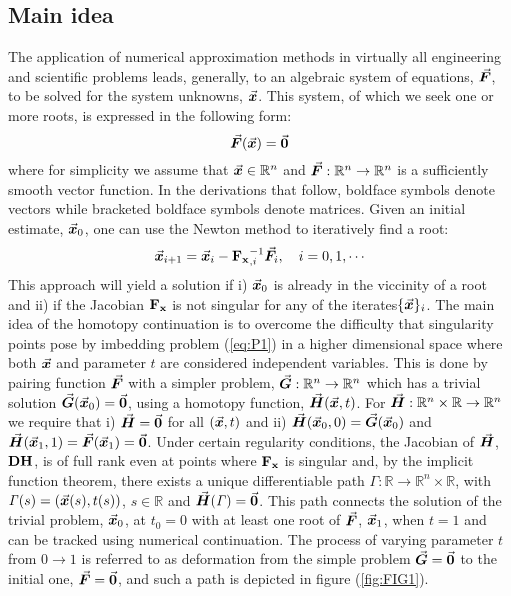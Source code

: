 \subsection{Main idea}\label{CH4-S1SS1}

The application of numerical approximation methods in virtually all engineering
and scientific problems leads, generally, to an algebraic system of equations,
$\vec{\bm{F}}$, to
be solved for the system unknowns, $\vec{\bm{x}}$. This system, of which we seek one
or more roots, is expressed in the following form:
\begin{equation}
\vec{\bm{F}}(\vec{\bm{x}})=\vec{\bm{0}}
\label{eq:P1}
\end{equation}
where for simplicity we assume that $\vec{\bm{x}}\in\mathbb{R}^n$ and
$\vec{\bm{F}}:\mathbb{R}^n\rightarrow\mathbb{R}^n$ is a
sufficiently smooth vector function. In the derivations that follow, boldface
symbols denote vectors while bracketed boldface symbols denote matrices. Given 
an initial estimate, $\vec{\bm{x}}_0$,
one can use the Newton method to iteratively find a root:
\begin{equation}
\bvec{x}_{i+1} = \bvec{x}_i-\bmat{F_x}^{-1}_{,i}\bvec{F}_i,\quad i=0,1,\cdots
\label{eq:NEWTON}
\end{equation}
This approach will yield a solution if i) $\vec{\bm{x}}_0$ is already in the 
viccinity
of a root and ii) if the Jacobian $\mathbf{F_x}$ is not singular for any of 
the iterates$\{\vec{\bm{x}}\}_i$. The main idea of the homotopy continuation is to 
overcome the difficulty that
singularity points pose by imbedding problem (\ref{eq:P1}) in a higher
dimensional space where both $\vec{\bm{x}}$ and parameter $t$ are considered 
independent variables.
This is done by pairing function $\vec{\bm{F}}$ with a simpler problem,
$\vec{\bm{G}}:\mathbb{R}^n\rightarrow\mathbb{R}^n$ which has a trivial solution 
$\vec{\bm{G}}(\vec{\bm{x}}_0)=\vec{\bm{0}}$, using a homotopy function, 
$\vec{\bm{H}}(\vec{\bm{x}},t)$. 
For $\vec{\bm{H}}:\mathbb{R}^n\times\mathbb{R}\rightarrow \mathbb{R}^n$ we require
that
i) $\vec{\bm{H}}=\vec{\bm{0}}$ for all $(\vec{\bm{x}},t)$ and ii)
$\vec{\bm{H}}(\vec{\bm{x}}_0,0)=\vec{\bm{G}}(\vec{\bm{x}}_0)$ and
$\vec{\bm{H}}(\vec{\bm{x}}_1,1)=\vec{\bm{F}}(\vec{\bm{x}}_1)=\vec{\bm{0}}$. Under certain 
regularity 
conditions, the Jacobian of
$\vec{\bm{H}}$, $\mathbf{DH}$, is of full rank even at points where $\mathbf{F_x}$ 
is
singular and, by the implicit function theorem, there exists a unique 
differentiable path
$\mathit{\Gamma}:\mathbb{R}\rightarrow\mathbb{R}^{n}\times\mathbb{R}$, 
with $\mathit{\Gamma}(s)=(\vec{\bm{x}}(s),t(s))$, $s\in\mathbb{R}$ and
$\vec{\bm{H}}(\mathit{\Gamma})=\vec{\bm{0}}$.
This path connects the solution of the trivial problem, $\vec{\bm{x}}_0$, at $t_0=0$
with at least one root of $\vec{\bm{F}}$, $\vec{\bm{x}}_1$, when $t=1$ and can be
tracked using numerical continuation\cite{Allgower:2003}. The process of 
varying parameter $t$ from $0\rightarrow 1$
is referred to as deformation from the simple problem $\vec{\bm{G}}=\vec{\bm{0}}$ to 
the initial one, $\vec{\bm{F}}=\vec{\bm{0}}$, and such a path is depicted in figure 
(\ref{fig:FIG1}).

